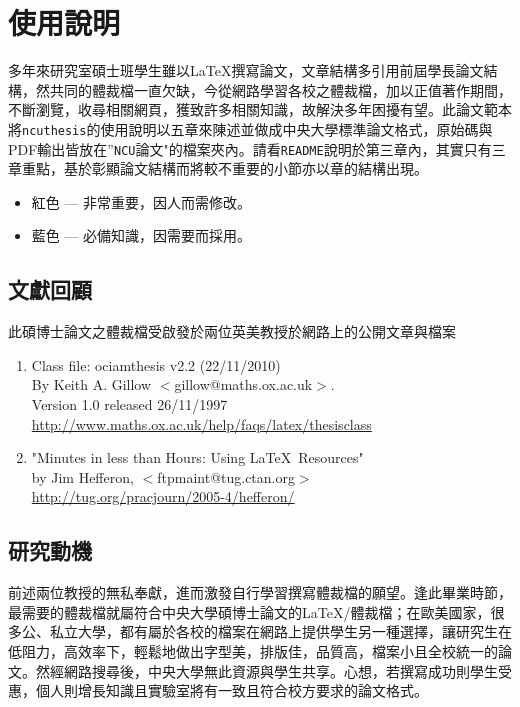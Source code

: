 \chapter{使用說明}

多年來研究室碩士班學生雖以\LaTeX 撰寫論文，文章結構多引用前屆學長論文結構，然共同的體裁檔一直欠缺，今從網路學習各校之體裁檔，加以正值著作期間，不斷瀏覽，收尋相關網頁，獲致許多相關知識，故解決多年困擾有望。此論文範本將{\tt ncuthesis}的使用說明以五章來陳述並做成中央大學標準論文格式，原始碼與PDF輸出皆放在''{\tt NCU}論文"的檔案夾內。請看{\tt README}說明於第三章內，其實只有三章重點，基於彰顯論文結構而將較不重要的小節亦以章的結構出現。
\begin{itemize}
\item {\color{red}紅色} ---  非常重要，因人而需修改。
\item {\color{blue}藍色} --- 必備知識，因需要而採用。
\end{itemize}
\section{文獻回顧}
此碩博士論文之體裁檔受啟發於兩位英美教授於網路上的公開文章與檔案
\begin{enumerate}
\item Class file: ociamthesis v2.2 (22/11/2010) \\
    By Keith A. Gillow $<$gillow@maths.ox.ac.uk$>$. \\
    Version 1.0 released 26/11/1997\\
	\url{http://www.maths.ox.ac.uk/help/faqs/latex/thesisclass}
\item "Minutes in less than Hours: Using \LaTeX\ Resources" \\
    by Jim Hefferon, $<$ftpmaint@tug.ctan.org$>$\\
	\url{http://tug.org/pracjourn/2005-4/hefferon/}
\end{enumerate}

\section{研究動機}
前述兩位教授的無私奉獻，進而激發自行學習撰寫體裁檔的願望。逢此畢業時節，最需要的體裁檔就屬符合中央大學碩博士論文的\LaTeX{}/\XeLaTeX{}體裁檔；在歐美國家，很多公、私立大學，都有屬於各校的檔案在網路上提供學生另一種選擇，讓研究生在低阻力，高效率下，輕鬆地做出字型美，排版佳，品質高，檔案小且全校統一的論文。然經網路搜尋後，中央大學無此資源與學生共享。心想，若撰寫成功則學生受惠，個人則增長知識且實驗室將有一致且符合校方要求的論文格式。

